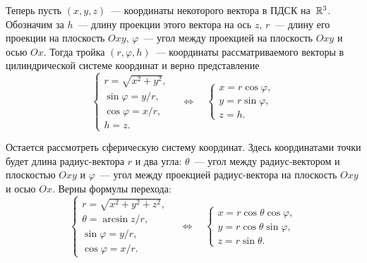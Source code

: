 	Теперь пусть $(x, y, z)$~--- координаты некоторого вектора в ПДСК на~$\mathbb{R}^3$. Обозначим за $h$~--- длину проекции этого вектора на ось $z$, $r$~--- длину его проекции на плоскость $Oxy$, $\varphi$~--- угол между проекцией на плоскость $Oxy$ и осью $Ox$. Тогда тройка $(r, \varphi, h)$~--- координаты рассматриваемого векторы в цилиндрической системе координат и верно представление
	\begin{equation}
		\begin{cases}
			r = \sqrt{x^2 + y^2},\\
			\sin \varphi = y/r,\\
			\cos \varphi = x/r,\\
			h = z.
		\end{cases}
		\quad \Leftrightarrow \quad 
		\begin{cases}
			x = r \cos \varphi,\\
			y = r \sin \varphi,\\
			z = h.
		\end{cases}
	\end{equation}
	
	Остается рассмотреть сферическую систему координат. Здесь координатами точки будет длина радиус-вектора $r$ и два угла: $\theta$~--- угол между радиус-вектором и плоскостью $Oxy$ и $\varphi$~--- угол между проекцией радиус-вектора на плоскость $Oxy$ и осью $Ox$. Верны формулы перехода:
	\begin{equation}
		\begin{cases}
			r = \sqrt{x^2 + y^2 + z^2},\\
			\theta = \arcsin{z/r},\\
			\sin \varphi = y/r,\\
			\cos \varphi = x/r.
		\end{cases}
		\quad \Leftrightarrow \quad
		\begin{cases}
			x = r \cos \theta \cos \varphi	,\\
			y = r \cos \theta \sin \varphi,\\
			z = r \sin \theta.
		\end{cases}
	\end{equation}
